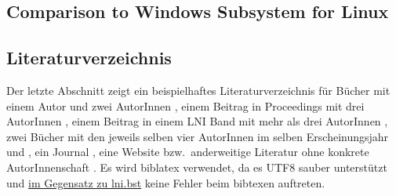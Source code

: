 \documentclass[utf8,biblatex]{lni}
\begin{document}
\subsection{Comparison to Windows Subsystem for Linux}

\subsection{Literaturverzeichnis}
Der letzte Abschnitt zeigt ein beispielhaftes Literaturverzeichnis für Bücher mit einem Autor \cite{Ez10} und zwei AutorInnen \cite{AB00}, einem Beitrag in Proceedings mit drei AutorInnen \cite{ABC01}, einem Beitrag in einem LNI Band mit mehr als drei AutorInnen \cite{Az09}, zwei Bücher mit den jeweils selben vier AutorInnen im selben Erscheinungsjahr \cite{Wa14} und \cite{Wa14b}, ein Journal \cite{Gl06}, eine Website \cite{GI14} bzw.\ anderweitige Literatur ohne konkrete AutorInnenschaft \cite{XX14}.
Es wird biblatex verwendet, da es UTF8 sauber unterstützt und \href{https://github.com/gi-ev/LNI/issues/5}{im Gegensatz zu lni.bst} keine Fehler beim bibtexen auftreten.
\end{document}
